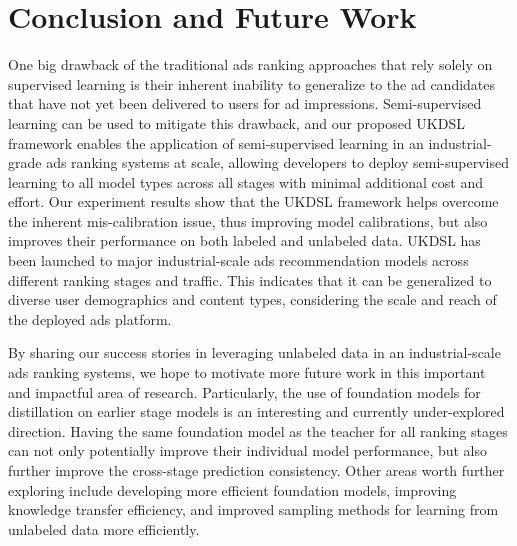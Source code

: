 \section{Conclusion and Future Work}
\label{sec:discussions_future}

One big drawback of the traditional ads ranking approaches that rely solely on supervised learning is their inherent inability to generalize to the ad candidates that have not yet been delivered to users for ad impressions. Semi-supervised learning can be used to mitigate this drawback, and our proposed UKDSL framework enables the application of semi-supervised learning in an industrial-grade ads ranking systems at scale, allowing developers to deploy semi-supervised learning to all model types across all stages with minimal additional cost and effort. Our experiment results show that the UKDSL framework helps overcome the inherent mis-calibration issue, thus improving model calibrations, but also improves their performance on both labeled and unlabeled data.
UKDSL has been launched to major industrial-scale ads recommendation models across different ranking stages and traffic. This indicates that it can be generalized to diverse user demographics and content types, considering the scale and reach of the deployed ads platform.

By sharing our success stories in leveraging unlabeled data in an industrial-scale ads ranking systems, we hope to motivate more future work in this important and impactful area of research. Particularly, the use of foundation models for distillation on earlier stage models is an interesting and currently under-explored direction. Having the same foundation model as the teacher for all ranking stages can not only potentially improve their individual model performance, but also further improve the cross-stage prediction consistency. Other areas worth further exploring include developing more efficient foundation models, improving knowledge transfer efficiency, and improved sampling methods for learning from unlabeled data more efficiently. 
